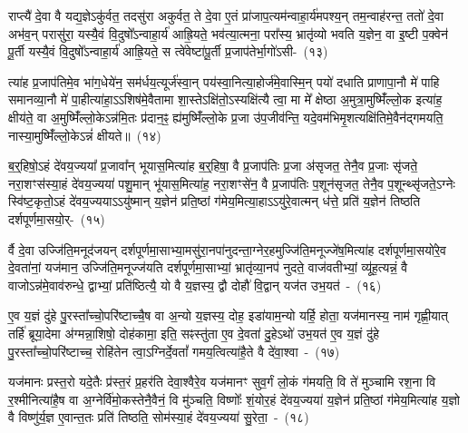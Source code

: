राप्त्यै॑ दे॒वा वै यद्य॒ज्ञे\-ऽकु॑र्वत॒ तदसु॑रा अकुर्वत॒ ते दे॒वा ए॒तं प्रा॑जाप॒त्यम॑न्वाहा॒र्य॑मपश्य॒न् तम॒न्वाह॑रन्त॒ ततो॑ दे॒वा अभ॑व॒न् परासु॑रा॒ यस्यै॒वं वि॒दुषो᳚\-ऽन्वाहा॒र्य॑ आह्रि॒यते॒ भव॑त्या॒त्मना॒ परा᳚स्य॒ भ्रातृ॑व्यो भवति य॒ज्ञेन॒ वा इ॒ष्टी प॒क्वेन॑ पू॒र्ती यस्यै॒वं वि॒दुषो᳚\-ऽन्वाहा॒र्य॑ आह्रि॒यते॒ स त्वे॑वेष्टा॑पू॒र्ती प्र॒जाप॑तेर्भा॒गो॑\-\mbox{ऽसी-~(१३)}

त्या॑ह प्र॒जा\-प॑तिमे॒व भा॑ग॒धेये॑न॒ सम॑र्धय॒त्यूर्ज॑स्वा॒न् पय॑स्वा॒नित्या॒होर्ज॑मे॒वास्मि॒न् पयो॑ दधाति प्राणापा॒नौ मे॑ पाहि समानव्या॒नौ मे॑ पा॒हीत्या॑हा॒\-ऽ\-ऽशिष॑मे॒वैतामा शा॒स्ते\-ऽक्षि॑तो॒\-ऽस्यक्षि॑त्यै त्वा॒ मा मे᳚ क्षेष्ठा अ॒मुत्रा॒मुष्मिँ॑ल्लो॒क इत्या॑ह॒ क्षीय॑ते॒ वा अ॒मुष्मिँ॑ल्लो॒के\-ऽन्न॑मि॒तः प्र॑दान॒ꣴ॒ ह्य॑मुष्मिँ॑ल्लो॒के प्र॒जा उ॑प॒जीव॑न्ति॒ यदे॒वम॑भिमृ॒शत्यक्षि॑तिमे॒वैन॑द्गमयति॒ नास्या॒मुष्मिँ॑ल्लो॒के\-ऽन्नं॑ क्षीयते॥~(१४)

{\anuvakamend[{अ॒न्वा॒हा॒र्ये॑ण प्र॒जाप॑तेरसि॒ ह्य॑मुष्मिँ॑ल्लो॒के पञ्च॑दश च}]}%

ब॒र्॒\mbox{}हिषो॒\-ऽहं दे॑वय॒ज्यया᳚ प्र॒जावा᳚न् भूयास॒मित्या॑ह ब॒र्॒\mbox{}हिषा॒ वै प्र॒जा\-प॑तिः प्र॒जा अ॑सृजत॒ तेनै॒व प्र॒जाः सृ॑जते॒ नरा॒शꣳस॑स्या॒हं दे॑वय॒ज्यया॑ पशु॒मान् भू॑यास॒मित्या॑ह॒ नरा॒शꣳसे॑न॒ वै प्र॒जा\-प॑तिः प॒शून॑सृजत॒ तेनै॒व प॒शून्थ्सृ॑जते॒\-ऽग्नेः स्वि॑ष्ट॒कृतो॒\-ऽहं दे॑वय॒ज्यया\-ऽ\-ऽयु॑ष्मान् य॒ज्ञेन॑ प्रति॒ष्ठां ग॑मेय॒मित्या॒हा\-ऽ\-ऽयु॑रे॒वात्मन् ध॑त्ते॒ प्रति॑ य॒ज्ञेन॑ तिष्ठति दर्\mbox{}श\-पूर्ण\-मा॒सयो॒र्-~(१५)

र्वै दे॒वा उज्जि॑ति॒मनूद॑जयन् दर्\mbox{}श\-पूर्ण\-मा॒साभ्या॒मसु॑रा॒नपा॑\-नुदन्ता॒ग्नेर॒ह\-मुज्जि॑ति॒\-मनूज्जे॑ष॒मित्या॑ह दर्\mbox{}श\-पूर्ण\-मा॒सयो॑रे॒व दे॒वता॑नां॒ यज॑मान॒ उज्जि॑ति॒मनूज्ज॑यति दर्\mbox{}श\-पूर्ण\-मा॒साभ्यां॒ भ्रातृ॑व्या॒नप॑ नुदते॒ वाज॑वतीभ्यां॒ व्यू॑ह॒त्यन्नं॒ वै वाजो\-ऽन्न॑मे॒वाव॑\-रुन्धे॒ द्वाभ्यां॒ प्रति॑ष्ठित्यै॒ यो वै य॒ज्ञस्य॒ द्वौ दोहौ॑ वि॒द्वान् यज॑त उभ॒यत॑~-~(१६)

ए॒व य॒ज्ञं दु॑हे पु॒रस्ता᳚च्चो॒परि॑ष्टाच्चै॒ष वा अ॒न्यो य॒ज्ञस्य॒ दोह॒ इडा॑याम॒न्यो यर्\mbox{}हि॒ होता॒ यज॑मानस्य॒ नाम॑ गृह्णी॒यात् तर्\mbox{}हि॑ ब्रूया॒देमा अ॑ग्मन्ना॒शिषो॒ दोह॑कामा॒ इति॒ सꣴस्तु॑ता ए॒व दे॒वता॑ दु॒हे\-ऽथो॑ उभ॒यत॑ ए॒व य॒ज्ञं दु॑हे पु॒रस्ता᳚च्चो॒परि॑ष्टाच्च॒ रोहि॑तेन त्वा॒\-ऽग्निर्दे॒वतां᳚ गमय॒त्वित्या॑है॒ते वै दे॑वा॒श्वा~-~(१७)

यज॑मानः प्रस्त॒रो यदे॒तैः प्र॑स्त॒रं प्र॒हर॑ति देवा॒श्वैरे॒व यज॑मानꣳ सुव॒र्गं लो॒कं ग॑मयति॒ वि ते॑ मुञ्चामि रश॒ना वि र॒श्मीनित्या॑है॒ष वा अ॒ग्नेर्वि॑मो॒कस्तेनै॒वैनं॒ वि मु॑ञ्चति॒ विष्णोः᳚ शं॒योर॒हं दे॑वय॒ज्यया॑ य॒ज्ञेन॑ प्रति॒ष्ठां ग॑मेय॒मित्या॑ह य॒ज्ञो वै विष्णु॑र्य॒ज्ञ ए॒वान्त॒तः प्रति॑ तिष्ठति॒ सोम॑स्या॒हं दे॑वय॒ज्यया॑ सु॒रेता॒~-~(१८)

